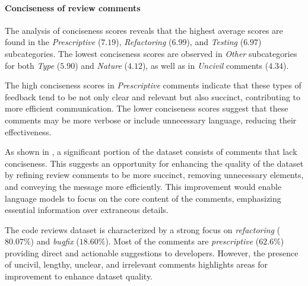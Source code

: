 \paragraph*{\textbf{Conciseness of review comments}}

The analysis of conciseness scores reveals that the highest average scores are found in the \emph{Prescriptive} ($7.19$), \emph{Refactoring} ($6.99$), and \emph{Testing} ($6.97$) subcategories. The lowest conciseness scores are observed in \emph{Other} subcategories for both \emph{Type} ($5.90$) and \emph{Nature} ($4.12$), as well as in \emph{Uncivil} comments ($4.34$).

The high conciseness scores in \emph{Prescriptive} comments indicate that these types of feedback tend to be not only clear and relevant but also succinct, contributing to more efficient communication. 
The lower conciseness scores suggest that these comments may be more verbose or include unnecessary language, reducing their effectiveness.

As shown in , a significant portion of the dataset consists of comments that lack conciseness. This suggests an opportunity for enhancing the quality of the dataset by refining review comments to be more succinct, removing unnecessary elements, and conveying the message more efficiently. This improvement would enable language models to focus on the core content of the comments, emphasizing essential information over extraneous details.




\begin{center}
\begin{tcolorbox}[colframe=teal!75!black, colback=teal!5!white, title=\textbf{Answer to RQ1}]
The code reviews dataset is characterized by a strong focus on \emph{refactoring} ($80.07\%$) and \emph{bugfix} ($18.60\%$). Most of the comments are \emph{prescriptive} ($62.6\%$) providing direct and actionable suggestions to developers.
However, the presence of uncivil, lengthy, unclear, and irrelevant comments highlights areas for improvement to enhance dataset quality.
\end{tcolorbox}
\end{center}